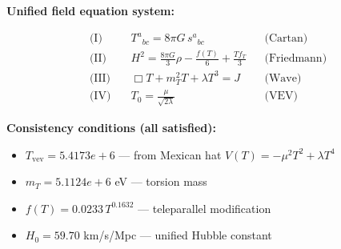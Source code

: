 
\textbf{Unified field equation system:}

\begin{align}
  \text{(I)} \quad & T^a{}_{bc} = 8\pi G \, s^a{}_{bc} && \text{(Cartan)} \\
  \text{(II)} \quad & H^2 = \frac{8\pi G}{3}\rho - \frac{f(T)}{6} + \frac{Tf_T}{3} && \text{(Friedmann)} \\
  \text{(III)} \quad & \Box T + m_T^2 T + \lambda T^3 = J && \text{(Wave)} \\
  \text{(IV)} \quad & T_0 = \frac{\mu}{\sqrt{2\lambda}} && \text{(VEV)}
\end{align}

\textbf{Consistency conditions (all satisfied):}
\begin{itemize}
  \item $T_{\text{vev}} = 5.4173e+6$ — from Mexican hat $V(T) = -\mu^2 T^2 + \lambda T^4$
  \item $m_T = 5.1124e+6$ eV — torsion mass
  \item $f(T) = 0.0233 \, T^{0.1632}$ — teleparallel modification
  \item $H_0 = 59.70$ km/s/Mpc — unified Hubble constant
\end{itemize}
